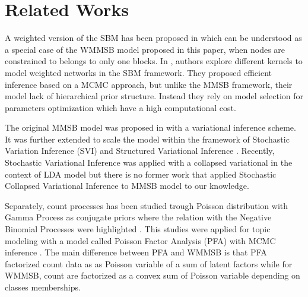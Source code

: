 \section{Related Works}
\label{sec:rl}



A weighted version of the SBM has been proposed in \cite{aicher2014learning} which can be understood as a special case of the WMMSB model proposed in this paper, when nodes are constrained to belongs to only one blocks. In \cite{peixoto2018nonparametric}, authors explore different kernels to model weighted networks in the SBM framework. They proposed efficient inference based on a MCMC approach, but unlike the MMSB framework, their model lack of hierarchical prior structure. Instead they rely on model selection for parameters optimization which have a high computational cost.

The original MMSB model was proposed in \cite{airoldi2009mixed} with a variational inference scheme. It was further extended to scale the model within the framework of Stochastic Variation Inference (SVI) \cite{gopalan2013efficient} and Structured Variational Inference \cite{kim2013efficient}. Recently, Stochastic Variational Inference was applied with a collapsed variational in the context of LDA model \cite{foulds2013stochastic} but there is no former work that applied Stochastic Collapsed Variational Inference to MMSB model to our knowledge.

Separately, count processes has been studied trough Poisson distribution with Gamma Process as conjugate priors where the relation with the Negative Binomial Processes were highlighted \cite{zhou2012augment} \cite{zhou2015negative}. This studies were applied for topic modeling with a model called Poisson Factor Analysis (PFA) with MCMC inference \cite{zhou2012beta}. The main difference between PFA and WMMSB is that PFA factorized count data as as  Poisson variable of a sum of latent factors while for WMMSB, count are  factorized as a convex sum of Poisson variable depending on classes memberships.




